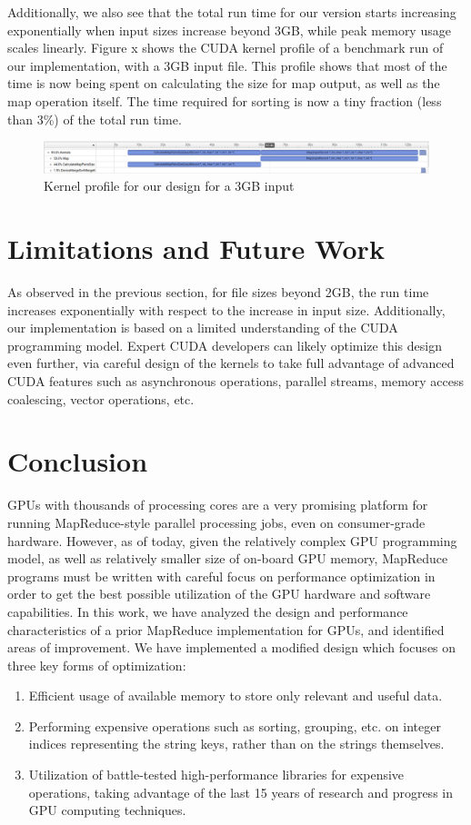 \documentclass{article}
\begin{document}
Additionally, we also see that the total run time for our version starts increasing exponentially when input sizes increase beyond 3GB, while peak memory usage scales linearly. Figure x shows the CUDA kernel profile of a benchmark run of our implementation, with a 3GB input file. This profile shows that most of the time is now being spent on calculating the size for map output, as well as the map operation itself. The time required for sorting is now a tiny fraction (less than 3\%) of the total run time. 

\begin{figure}
    \centering
    \includegraphics[width=1\linewidth]{images/mr-kernels-3gb.png}
    \caption{Kernel profile for our design for a 3GB input}
    \label{fig:mr-kernels-3gb}
\end{figure}

\section{Limitations and Future Work}
As observed in the previous section, for file sizes beyond 2GB, the run time increases exponentially with respect to the increase in input size. Additionally, our implementation is based on a limited understanding of the CUDA programming model. Expert CUDA developers can likely optimize this design even further, via careful design of the kernels to take full advantage of advanced CUDA features such as asynchronous operations, parallel streams, memory access coalescing, vector operations, etc.  

\section{Conclusion}
GPUs with thousands of processing cores are a very promising platform for running MapReduce-style parallel processing jobs, even on consumer-grade hardware. However, as of today, given the relatively complex GPU programming model, as well as relatively smaller size of on-board GPU memory, MapReduce programs must be written with careful focus on performance optimization in order to get the best possible utilization of the GPU hardware and software capabilities. 
In this work, we have analyzed the design and performance characteristics of a prior MapReduce implementation for GPUs, and identified areas of improvement. We have implemented a modified design which focuses on three key forms of optimization:
\begin{enumerate}
    \item Efficient usage of available memory to store only relevant and useful data.
    \item Performing expensive operations such as sorting, grouping, etc. on integer indices representing the string keys, rather than on the strings themselves.
    \item Utilization of battle-tested high-performance libraries for expensive operations, taking advantage of the last 15 years of research and progress in GPU computing techniques.
\end{enumerate}
\end{document}
